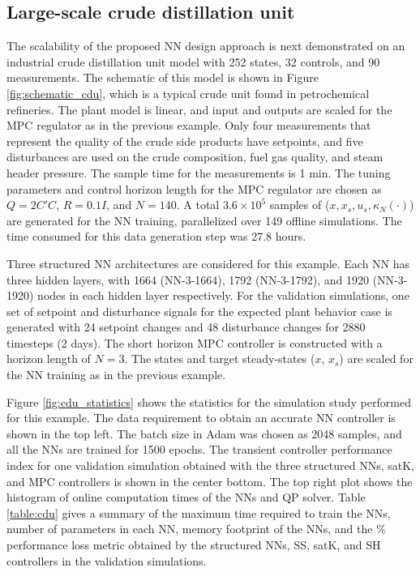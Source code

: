 \documentclass[preprint,5p, twocolumn, authoryear]{elsarticle}
\begin{document}
\subsection{Large-scale crude distillation unit}

The scalability of the proposed NN design approach is next demonstrated on an
industrial crude distillation unit model
\citep*{pannocchia:rawlings:wright:2007} with 252 states, 32 controls, and 90
measurements. The schematic of this model is shown in Figure
\ref{fig:schematic_cdu}, which is a typical crude unit found in petrochemical
refineries. The plant model is linear, and input and outputs are scaled for the
MPC regulator as in the previous example. Only four measurements that represent
the quality of the crude side products have setpoints, and five disturbances are
used on the crude composition, fuel gas quality, and steam header pressure. The
sample time for the measurements is 1 min. The tuning parameters and control
horizon length for the MPC regulator are chosen as $Q = 2C'C$, $R = 0.1I$, and
$N = 140$. A total $3.6 \times 10^5$ samples of ($x, x_s, u_s, \kappa_N(\cdot)$)
are generated for the NN training, parallelized over 149 offline simulations.
The time consumed for this data generation step was 27.8 hours.

Three structured NN architectures are considered for this example. Each NN has
three hidden layers, with 1664 (NN-3-1664), 1792 (NN-3-1792), and 1920
(NN-3-1920) nodes in each hidden layer respectively. For the validation
simulations, one set of setpoint and disturbance signals for the expected plant
behavior case is generated with 24 setpoint changes and 48 disturbance changes
for 2880 timesteps (2 days). The short horizon MPC controller is constructed
with a horizon length of $N = 3$. The states and target steady-states ($x$,
$x_s$) are scaled for the NN training as in the previous example. 

Figure \ref{fig:cdu_statistics} shows the statistics for the simulation study
performed for this example. The data requirement to obtain an accurate NN
controller is shown in the top left. The batch size in Adam was chosen as 2048
samples, and all the NNs are trained for 1500 epochs. The transient controller
performance index for one validation simulation obtained with the three
structured NNs, satK, and MPC controllers is shown in the center bottom. The top
right plot shows the histogram of online computation times of the NNs and QP
solver. Table \ref{table:cdu} gives a summary of the maximum time required to
train the NNs, number of parameters in each NN, memory footprint of the NNs, and
the $\%$ performance loss metric obtained by the structured NNs, SS, satK, and
SH controllers in the validation simulations. 
\end{document}
